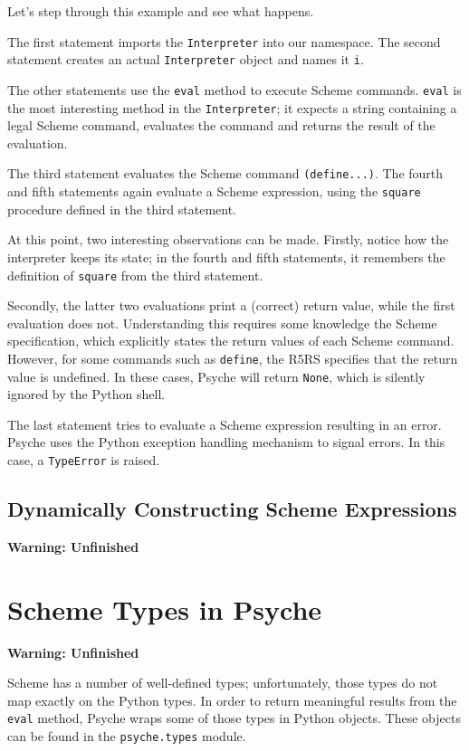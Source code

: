 \documentclass{report}
\newcommand{\code}[1]{\texttt{#1}}
\newcommand{\TODO}{\textbf{Warning: Unfinished} \\}
\begin{document}
Let's step through this example and see what happens.

The first statement imports the \code{Interpreter} into our
namespace. The second statement creates an actual \code{Interpreter}
object and names it \code{i}.

The other statements use the \code{eval} method to execute Scheme
commands. \code{eval} is the most interesting method in the
\code{Interpreter}; it expects a string containing a legal Scheme
command, evaluates the command and returns the result of the
evaluation. 

The third statement evaluates the Scheme command \code{(define...)}. 
The fourth and fifth statements again evaluate a Scheme expression,
using the \code{square} procedure defined in the third statement. 

At this point, two interesting observations can be made. Firstly,
notice how the interpreter keeps its state; in the fourth and fifth
statements, it remembers the definition of \code{square} from the
third statement.

Secondly, the latter two evaluations print a (correct) return value,
while the first evaluation does not. Understanding this requires some
knowledge the Scheme specification, which explicitly states the return
values of each Scheme command. However, for some commands such as
\code{define}, the R5RS specifies that the return value is
undefined. In these cases, Psyche will return \code{None}, which is
silently ignored by the Python shell.

The last statement tries to evaluate a Scheme expression resulting in
an error. Psyche uses the Python exception handling mechanism to
signal errors. In this case, a \code{TypeError} is raised.


\section{Dynamically Constructing Scheme Expressions}
\TODO{}


%
%
\chapter{Scheme Types in Psyche}
\label{chap:types}
\TODO{}

Scheme has a number of well-defined types; unfortunately, those types
do not map exactly on the Python types. In order to return meaningful
results from the \code{eval} method, Psyche wraps some
of those types in Python objects. These objects can be found in the
\code{psyche.types} module.
\end{document}
